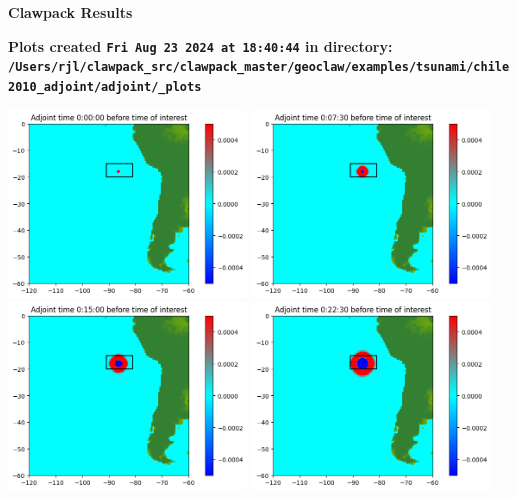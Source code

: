 \documentclass[11pt]{article}
\begin{document}
        \begin{center}{\Large\bf Clawpack Results}\vskip 5pt
        
        \bf Plots created {\tt Fri Aug 23 2024 at 18:40:44} in directory: \vskip 5pt
        \verb+/Users/rjl/clawpack_src/clawpack_master/geoclaw/examples/tsunami/chile2010_adjoint/adjoint/_plots+
        \end{center}
        \vskip 5pt
        \includegraphics[width=0.475\textwidth]{frame0000fig0.png}
\vskip 10pt 
\includegraphics[width=0.475\textwidth]{frame0001fig0.png}
\vskip 10pt 
\includegraphics[width=0.475\textwidth]{frame0002fig0.png}
\vskip 10pt 
\includegraphics[width=0.475\textwidth]{frame0003fig0.png}
\end{document}
